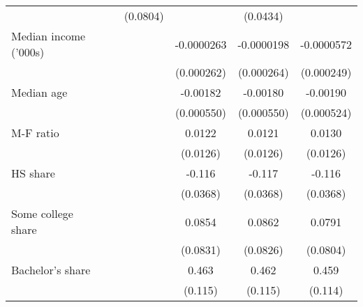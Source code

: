 {\begin{tabular}{l*{6}{c}}
                    &                     &                     &    (0.0804)         &                     &    (0.0434)         &                     \\
\addlinespace
Median income ('000s)&                     &                     &                     &  -0.0000263         &  -0.0000198         &  -0.0000572         \\
                    &                     &                     &                     &  (0.000262)         &  (0.000264)         &  (0.000249)         \\
\addlinespace
Median age          &                     &                     &                     &    -0.00182\sym{***}&    -0.00180\sym{***}&    -0.00190\sym{***}\\
                    &                     &                     &                     &  (0.000550)         &  (0.000550)         &  (0.000524)         \\
\addlinespace
M-F ratio           &                     &                     &                     &      0.0122         &      0.0121         &      0.0130         \\
                    &                     &                     &                     &    (0.0126)         &    (0.0126)         &    (0.0126)         \\
\addlinespace
HS share            &                     &                     &                     &      -0.116\sym{***}&      -0.117\sym{***}&      -0.116\sym{***}\\
                    &                     &                     &                     &    (0.0368)         &    (0.0368)         &    (0.0368)         \\
\addlinespace
Some college share  &                     &                     &                     &      0.0854         &      0.0862         &      0.0791         \\
                    &                     &                     &                     &    (0.0831)         &    (0.0826)         &    (0.0804)         \\
\addlinespace
Bachelor's share    &                     &                     &                     &       0.463\sym{***}&       0.462\sym{***}&       0.459\sym{***}\\
                    &                     &                     &                     &     (0.115)         &     (0.115)         &     (0.114)         \\

\end{tabular}}
